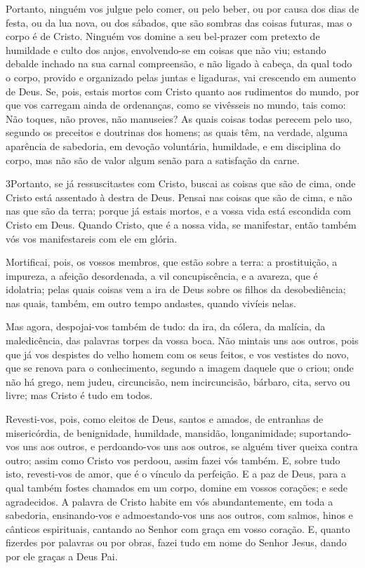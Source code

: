 Portanto, ninguém vos julgue pelo comer, ou pelo beber, ou por
causa dos dias de festa, ou da lua nova, ou dos sábados, que
são sombras das coisas futuras, mas o corpo é de Cristo.
Ninguém vos domine a seu bel-prazer com pretexto de humildade
e culto dos anjos, envolvendo-se em coisas que não viu; estando
debalde inchado na sua carnal compreensão, e não ligado à
cabeça, da qual todo o corpo, provido e organizado pelas juntas e
ligaduras, vai crescendo em aumento de Deus. Se, pois, estais
mortos com Cristo quanto aos rudimentos do mundo, por que vos
carregam ainda de ordenanças, como se vivêsseis no mundo, tais como:
Não toques, não proves, não manuseies? As quais coisas
todas perecem pelo uso, segundo os preceitos e doutrinas dos homens;
as quais têm, na verdade, alguma aparência de sabedoria, em
devoção voluntária, humildade, e em disciplina do corpo, mas não são
de valor algum senão para a satisfação da carne.

\medskip

\lettrine{3} Portanto, se já ressuscitastes com Cristo, buscai
as coisas que são de cima, onde Cristo está assentado à destra de
Deus. Pensai nas coisas que são de cima, e não nas que são da
terra; porque já estais mortos, e a vossa vida está escondida
com Cristo em Deus. Quando Cristo, que é a nossa vida, se
manifestar, então também vós vos manifestareis com ele em glória.

Mortificai, pois, os vossos membros, que estão sobre a terra: a
prostituição, a impureza, a afeição desordenada, a vil
concupiscência, e a avareza, que é idolatria; pelas quais coisas
vem a ira de Deus sobre os filhos da desobediência; nas quais,
também, em outro tempo andastes, quando vivíeis nelas.

Mas agora, despojai-vos também de tudo: da ira, da cólera, da
malícia, da maledicência, das palavras torpes da vossa boca. Não
mintais uns aos outros, pois que já vos despistes do velho homem com
os seus feitos, e vos vestistes do novo, que se renova para o
conhecimento, segundo a imagem daquele que o criou; onde não
há grego, nem judeu, circuncisão, nem incircuncisão, bárbaro, cita,
servo ou livre; mas Cristo é tudo em todos.

Revesti-vos, pois, como eleitos de Deus, santos e amados, de
entranhas de misericórdia, de benignidade, humildade, mansidão,
longanimidade; suportando-vos uns aos outros, e perdoando-vos
uns aos outros, se alguém tiver queixa contra outro; assim como
Cristo vos perdoou, assim fazei vós também. E, sobre tudo
isto, revesti-vos de amor, que é o vínculo da perfeição. E a
paz de Deus, para a qual também fostes chamados em um corpo, domine
em vossos corações; e sede agradecidos. A palavra de Cristo
habite em vós abundantemente, em toda a sabedoria, ensinando-vos e
admoestando-vos uns aos outros, com salmos, hinos e cânticos
espirituais, cantando ao Senhor com graça em vosso coração.
E, quanto fizerdes por palavras ou por obras, fazei tudo em
nome do Senhor Jesus, dando por ele graças a Deus Pai.

